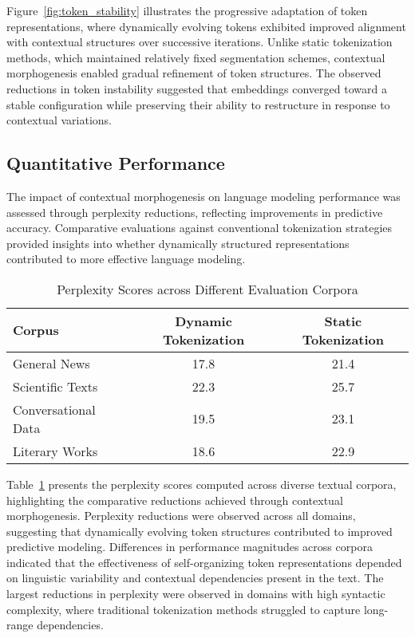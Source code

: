\documentclass{article}
\begin{document}
Figure~\ref{fig:token_stability} illustrates the progressive adaptation of token representations, where dynamically evolving tokens exhibited improved alignment with contextual structures over successive iterations. Unlike static tokenization methods, which maintained relatively fixed segmentation schemes, contextual morphogenesis enabled gradual refinement of token structures. The observed reductions in token instability suggested that embeddings converged toward a stable configuration while preserving their ability to restructure in response to contextual variations.

\subsection{Quantitative Performance}

The impact of contextual morphogenesis on language modeling performance was assessed through perplexity reductions, reflecting improvements in predictive accuracy. Comparative evaluations against conventional tokenization strategies provided insights into whether dynamically structured representations contributed to more effective language modeling.

\begin{table}[t]
	\centering
	\caption{Perplexity Scores across Different Evaluation Corpora}
	\label{tab:perplexity}
	\renewcommand{\arraystretch}{1.3}
	\setlength{\arrayrulewidth}{0.5mm}
	\setlength{\tabcolsep}{8pt}
		\begin{tabular}{|l|c|c|}
			\hline
			\textbf{Corpus} & \textbf{Dynamic Tokenization} & \textbf{Static Tokenization} \\
			\hline\hline
			General News & 17.8 & 21.4 \\
			\hline
			Scientific Texts & 22.3 & 25.7 \\
			\hline
			Conversational Data & 19.5 & 23.1 \\
			\hline
			Literary Works & 18.6 & 22.9 \\
			\hline
		\end{tabular}
\end{table}

Table~\ref{tab:perplexity} presents the perplexity scores computed across diverse textual corpora, highlighting the comparative reductions achieved through contextual morphogenesis. Perplexity reductions were observed across all domains, suggesting that dynamically evolving token structures contributed to improved predictive modeling. Differences in performance magnitudes across corpora indicated that the effectiveness of self-organizing token representations depended on linguistic variability and contextual dependencies present in the text. The largest reductions in perplexity were observed in domains with high syntactic complexity, where traditional tokenization methods struggled to capture long-range dependencies.
\end{document}
